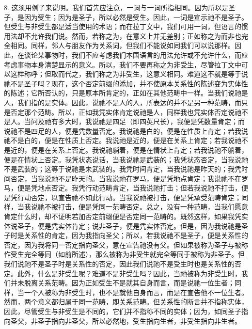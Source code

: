 8. 这须用例子来说明。我们首先应注意，一词与一词所指相同。因为所以是圣子，是因为受生；因为是圣子，所以必然是受生。因此，一词是宣示祂不是圣子。但受生与非受生都是适当使用的术语；而在拉丁文中，我们可用一词，但语言的惯用法却不允许我们说。然而，若称之为，在意义上并无差别；正如称之为而非也完全相同。同样，邻人与朋友作为关系词，但我们不能说如同我们可以说那样。因此，在谈论某事物时，我们不应考虑我们本国语言的用法允许或不允许什么，而应考虑事物本身清楚显示的意义。所以，我们不要再称之为非受生，尽管拉丁文中可以这样称呼；但取而代之，我们称之为非受生，这意义相同。难道这不就是等于说祂不是圣子吗？现在，这个否定前缀的添加，并不使原本关系性的陈述变为实体性的陈述；它所否认的，只是原本所肯定的，正如在其他范畴中一样。当我们说祂是人，我们指的是实体。因此，说祂不是人的人，所表达的并不是另一种范畴，而只是否定那个范畴。所以，正如我凭实体肯定说祂是人，同样我也凭实体否定说祂不是人。当问及祂有多大时，我说祂是四足（即四英尺长），我便是凭数量肯定；而说祂不是四足的人，便是凭数量否定。我说祂是白的，便是在性质上肯定；若我说祂不是白的，便是在性质上否定。我说祂是近的，便是在关系上肯定；若我说祂不是近的，便是在关系上否定。我说祂躺着，便是在情状上肯定；若我说祂不躺着，便是在情状上否定。我凭状态说话，当我说祂是武装的；我凭状态否定，当我说祂不是武装的；这等于说祂是未武装的。我凭时间肯定，当我说祂是昨天的；我凭时间否定，当我说祂不是昨天的。当我说祂在罗马，便是凭地点肯定；我说祂不在罗马，便是凭地点否定。我凭行动范畴肯定，当我说祂打击；但若我说祂不打击，便是凭行动否定，以宣告祂不如此行动。当我说祂被打击，便是凭承受范畴肯定；同样，当我说祂不被打击，便是凭同一范畴否定。总之，没有一种范畴，当我们愿意肯定什么时，却不证明若加否定前缀便是否定同一范畴的。既然这样，如果我凭实体说圣子，便是凭实体肯定；说非圣子，便是凭实体否定。但是，因为我说祂是圣子时是关系性的肯定，因为我指向圣父；所以，若我说祂不是圣子，便是关系性的否定，因为我将同一否定指向圣父，意在宣告祂没有父。但如果被称为圣子与被称作受生完全等同（如前所述），那么被称为非受生就完全等同于被称为非圣子。但我们说祂不是圣子时是关系性的否定，因此我们说祂不是受生时也是关系性的否定。此外，什么是非受生呢？难道不是非受生吗？因此，当祂被称为非受生时，我们并未脱离关系范畴。因为正如受生不是就其自身而言，而是说祂一位生者；同样，当一个人被称为非受生时，也不是就他自身而言，而是在宣告他不一位生者。然而，两个意义都归属于同一范畴，即关系范畴。但关系性的断言并不指称实体，因此，尽管受生与非受生是不同的，它们并不指称不同的实体；因为，如同圣子指向圣父，非圣子指向非圣父，所以必然地，受生指向生者，非受生指向非生者。\par

